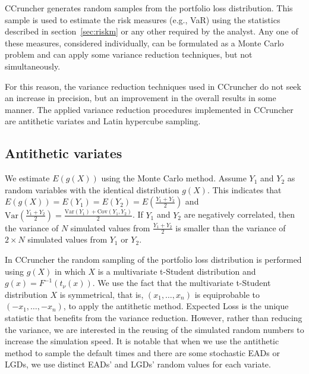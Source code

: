 \documentclass[11pt,fleqn]{book} %
\begin{document}
CCruncher generates random samples from the portfolio loss distribution.
This sample is used to estimate the risk measures (e.g., VaR) using the 
statistics described in section~\ref{sec:riskm} or any other required 
by the analyst. Any one of these measures, considered individually, can be 
formulated as a Monte Carlo problem and can apply some variance 
reduction techniques, but not simultaneously. 

For this reason, the variance reduction techniques used in CCruncher 
do not seek an increase in precision, but an improvement in the overall 
results in some manner. The applied variance reduction procedures 
implemented in CCruncher are antithetic variates and Latin hypercube 
sampling.

\subsection{Antithetic variates}
We estimate $E(g(X))$ using the Monte Carlo method. Assume $Y_1$ and 
$Y_2$ as random variables with the identical distribution $g(X)$. 
This indicates that $E(g(X)) = E(Y_1) = E(Y_2) = E(\frac{Y_1+Y_2}{2})$ and
$\text{Var}\left(\frac{Y_1+Y_2}{2}\right) = 
\frac{\text{Var}(Y_1)+\text{Cov}(Y_1,Y_2)}{2}$.
If $Y_1$ and $Y_2$ are negatively correlated, then the variance of $N$ 
simulated values from $\frac{Y_1+Y_2}{2}$ is smaller than the variance 
of $2{\times}N$ simulated values from $Y_1$ or $Y_2$.

In CCruncher the random sampling of the portfolio loss distribution is 
performed using $g(X)$ in which $X$ is a multivariate t-Student distribution 
and $g(x) = F^{-1}(t_{\nu}(x))$. We use the fact that the multivariate 
t-Student distribution $X$ is symmetrical, that is, $(x_1,\dots,x_n)$ is 
equiprobable to $(-x_1,\dots,-x_n)$, to apply the antithetic method. 
Expected Loss is the unique statistic that benefits from the variance 
reduction. However, rather than reducing the variance, we are interested 
in the reusing of the simulated random numbers to increase the simulation 
speed. It is notable that when we use the antithetic method to sample the 
default times and there are some stochastic EADs or LGDs, we use distinct 
EADs' and LGDs' random values for each variate.
\end{document}
